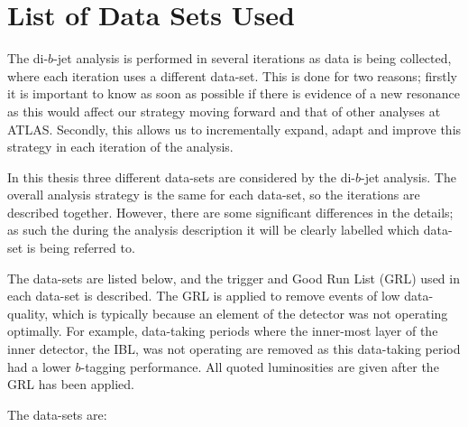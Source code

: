 \section{List of Data Sets Used}
\label{sec:evt-datasets}

The di-$b$-jet analysis is performed in several iterations
as data is being collected, where each iteration uses a different data-set.
This is done for two reasons;
firstly it is important to know as soon as possible
if there is evidence of a new resonance as
this would affect our strategy moving forward and that of other analyses at ATLAS.
Secondly, this allows us to incrementally
expand, adapt and improve this strategy in each iteration of the analysis.

In this thesis three different data-sets are considered by the di-$b$-jet analysis.
The overall analysis strategy is the same for each data-set,
so the iterations are described together.
However, there are some significant differences in the details;
as such the during the analysis description it will be clearly labelled
which data-set is being referred to.

The data-sets are listed below,
and the trigger and Good Run List (GRL) used in each data-set is described.
The GRL is applied to remove events of low data-quality,
which is typically because an element of the detector was not operating optimally.
For example, data-taking periods where the inner-most layer of the inner detector,
the IBL, was not operating are removed as
this data-taking period had a lower $b$-tagging performance.
All quoted luminosities are given after the GRL has been applied.

\noindent
The data-sets are:

